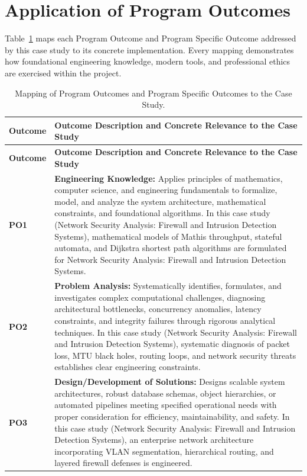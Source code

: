 \section{Application of Program Outcomes}
Table~\ref{tab:po} maps each Program Outcome and Program Specific Outcome addressed by this case study to its concrete implementation. Every mapping demonstrates how foundational engineering knowledge, modern tools, and professional ethics are exercised within the project.

{\small
\begin{longtable}{@{}>{\centering\arraybackslash}p{1.8cm} p{13.2cm}@{}}
    \caption{Mapping of Program Outcomes and Program Specific Outcomes to the Case Study.}\label{tab:po}\\
    \toprule
    \textbf{Outcome} & \textbf{Outcome Description and Concrete Relevance to the Case Study} \\
    \midrule
    \endfirsthead
    \toprule
    \textbf{Outcome} & \textbf{Outcome Description and Concrete Relevance to the Case Study} \\
    \midrule
    \endhead
\textbf{PO1} & \textbf{Engineering Knowledge:} Applies principles of mathematics, computer science, and engineering fundamentals to formalize, model, and analyze the system architecture, mathematical constraints, and foundational algorithms. In this case study (Network Security Analysis: Firewall and Intrusion Detection Systems), mathematical models of Mathis throughput, stateful automata, and Dijkstra shortest path algorithms are formulated for Network Security Analysis: Firewall and Intrusion Detection Systems. \\
    \addlinespace
\textbf{PO2} & \textbf{Problem Analysis:} Systematically identifies, formulates, and investigates complex computational challenges, diagnosing architectural bottlenecks, concurrency anomalies, latency constraints, and integrity failures through rigorous analytical techniques. In this case study (Network Security Analysis: Firewall and Intrusion Detection Systems), systematic diagnosis of packet loss, MTU black holes, routing loops, and network security threats establishes clear engineering constraints. \\
    \addlinespace
\textbf{PO3} & \textbf{Design/Development of Solutions:} Designs scalable system architectures, robust database schemas, object hierarchies, or automated pipelines meeting specified operational needs with proper consideration for efficiency, maintainability, and safety. In this case study (Network Security Analysis: Firewall and Intrusion Detection Systems), an enterprise network architecture incorporating VLAN segmentation, hierarchical routing, and layered firewall defenses is engineered. \\

\end{longtable}}
